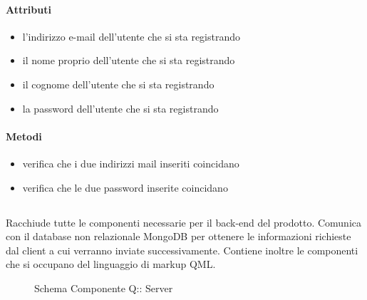 \paragraph{Attributi}
\begin{itemize}
\item {}
\newline
l'indirizzo e-mail dell'utente che si sta registrando
\item {}
\newline
il nome proprio dell'utente che si sta registrando
\item {}
\newline
il cognome dell'utente che si sta registrando
\item {}
\newline
la password dell'utente che si sta registrando
\end{itemize}
\paragraph{Metodi}
\begin{itemize}
\item {}
\newline
verifica che i due indirizzi mail inseriti coincidano
\newline
\item {}
\newline
verifica che le due password inserite coincidano
\newline
\end{itemize}
\subsection{}
Racchiude tutte le componenti necessarie per il back-end del prodotto. Comunica con il database non relazionale MongoDB per ottenere le informazioni richieste dal client a cui verranno inviate successivamente.
Contiene inoltre le componenti che si occupano del linguaggio di markup QML.
\begin{figure}[H]
\centering
\noindent{}
\caption[Schema Componente Server]{Schema Componente Q:: Server}
\end{figure}
